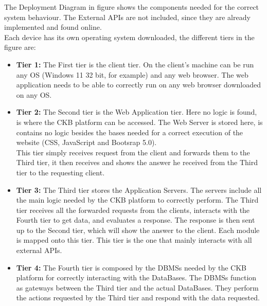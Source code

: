 \documentclass{article}
\begin{document}
{The Deployment Diagram in figure shows the components needed for the correct system behaviour. The External APIs are not included, since they 
are already implemented and found online.\\
Each device has its own operating system downloaded, the different tiers in the figure are:\\
\begin{itemize}
\item \textbf{Tier 1:} The First tier is the client tier. On the client's machine can be run any OS (Windows 11 32 bit, for example) and any web browser. The web application
needs to be able to correctly run on any web browser downloaded on any OS.\\
\item \textbf{Tier 2:} The Second tier is the Web Application tier. Here no logic is found, is where the CKB platform can be accessed.
The Web Server is stored here, is contains no logic besides the bases needed for a correct execution of the website (CSS, JavaScript and Bootsrap 5.0). \\
This tier simply receives request from the client and forwards them to the Third tier, it then receives and shows the answer he received from the Third tier
to the requesting client. \\
\item \textbf{Tier 3:} The Third tier stores the Application Servers. The servers include all the main logic needed by the CKB platform to correctly perform.
The Third tier receives all the forwarded requests from the clients, interacts with the Fourth tier to get data, and evaluates a response. The response is 
then sent up to the Second tier, which will show the answer to the client. Each module is mapped onto this tier. This tier is the one that mainly interacts
with all external APIs. \\
\item \textbf{Tier 4:} The Fourth tier is composed by the DBMSs needed by the CKB platform for correctly interacting with the DataBases. The DBMSs function as gateways 
between the Third tier and the actual DataBases. They perform the actions requested by the Third tier and respond with the data requested.\\
\end{itemize}
}
\end{document}
